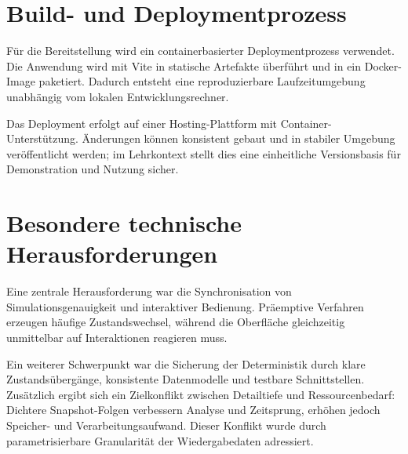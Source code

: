 \section{Build- und Deploymentprozess}

Für die Bereitstellung wird ein containerbasierter Deploymentprozess verwendet. Die Anwendung wird mit Vite in statische Artefakte überführt und in ein Docker-Image paketiert. Dadurch entsteht eine reproduzierbare Laufzeitumgebung unabhängig vom lokalen Entwicklungsrechner.

Das Deployment erfolgt auf einer Hosting-Plattform mit Container-Unterstützung. Änderungen können konsistent gebaut und in stabiler Umgebung veröffentlicht werden; im Lehrkontext stellt dies eine einheitliche Versionsbasis für Demonstration und Nutzung sicher.

\section{Besondere technische Herausforderungen}

Eine zentrale Herausforderung war die Synchronisation von Simulationsgenauigkeit und interaktiver Bedienung. Präemptive Verfahren erzeugen häufige Zustandswechsel, während die Oberfläche gleichzeitig unmittelbar auf Interaktionen reagieren muss.

Ein weiterer Schwerpunkt war die Sicherung der Deterministik durch klare Zustandsübergänge, konsistente Datenmodelle und testbare Schnittstellen. Zusätzlich ergibt sich ein Zielkonflikt zwischen Detailtiefe und Ressourcenbedarf: Dichtere Snapshot-Folgen verbessern Analyse und Zeitsprung, erhöhen jedoch Speicher- und Verarbeitungsaufwand. Dieser Konflikt wurde durch parametrisierbare Granularität der Wiedergabedaten adressiert.
